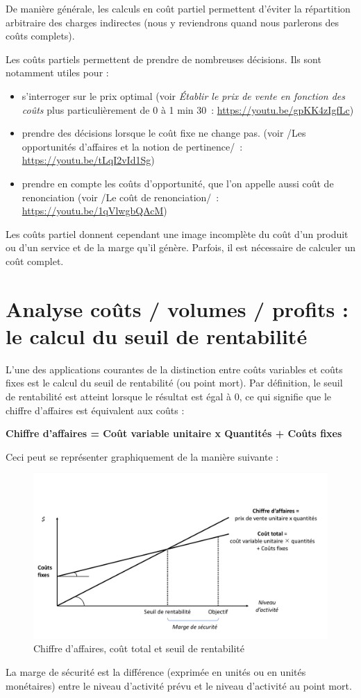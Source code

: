 \documentclass[oneside]{kaobook}
\begin{document}
De manière générale, les calculs en coût partiel permettent d'éviter la répartition arbitraire des charges indirectes (nous y reviendrons quand nous parlerons des coûts complets). 
\begin{kaobox}
Les coûts partiels permettent de prendre de nombreuses décisions. Ils sont notamment utiles pour :
\begin{itemize}
\item s'interroger sur le prix optimal (voir \emph{Établir le prix de vente en fonction des coûts} plus particulièrement de 0 à 1 min 30 : \url{https://youtu.be/gpKK4zIgfLc})
\item prendre des décisions lorsque le coût fixe ne change pas. (voir /Les opportunités d'affaires et la notion de pertinence/ : \url{https://youtu.be/tLqI2vId1Sg})
\item prendre en compte les coûts d'opportunité, que l'on appelle aussi coût de renonciation (voir /Le coût de renonciation/ : \url{https://youtu.be/1qVlwgbQAcM})
\end{itemize}
\end{kaobox}
Les coûts partiel donnent cependant une image incomplète du coût d'un produit ou d'un service et de la marge qu'il génère. Parfois, il est nécessaire de calculer un coût complet. 

\section{Analyse coûts / volumes / profits : le calcul du seuil de rentabilité}
\label{sec:orgd862175}
L'une des applications courantes de la distinction entre coûts variables et coûts fixes est le calcul du seuil de rentabilité (ou point mort). 
Par définition, le seuil de rentabilité est atteint lorsque le résultat est égal à 0, ce qui signifie que le chiffre d'affaires est équivalent aux coûts :
\begin{center}
\textbf{Chiffre d'affaires = Coût variable unitaire x Quantités + Coûts fixes}
\end{center}
Ceci peut se représenter graphiquement de la manière suivante :
\begin{figure}[H]

\includegraphics{./img/srcact.pdf}
\caption{Chiffre d'affaires, coût total et seuil de rentabilité}
\end{figure}
La marge de sécurité est la différence (exprimée en unités ou en unités monétaires) entre le niveau d'activité prévu et le niveau d'activité au point mort.
\end{document}
